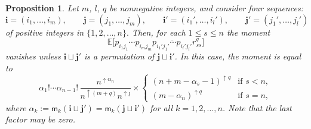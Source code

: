 \documentclass[pdftex]{sigma}
\numberwithin{equation}{section}
\newtheorem{Proposition}[Theorem]{Proposition}
\theoremstyle{definition}
\newcommand{\mult}{\mathsf{m}}
\begin{document}
\begin{Proposition}\label{prop:moment_R_ex1}
Let $m$, $l$, $q$ be nonnegative integers, and consider four sequences:
\[
\bm{i}=(i_1,\dots, i_m), \qquad \bm{j} =(j_1,\dots, j_m), \qquad
\bm{i}'=(i_1',\dots, i_l'), \qquad \bm{j}' =(j_1',\dots, j_l')
\]
 of positive integers in $\{1,2,\dots,n\}.$
Then, for each $1 \le s \le n$ the moment
\[
\mathbb{E} \bigl[p_{i_1 j_1} \cdots p_{i_m j_m} \overline{p_{i_1' j_1'} \cdots p_{i_l' j_l'}} r_{ss}^q\bigr]
\]
 vanishes unless $\bm{i} \sqcup \bm{j}'$ is a permutation of $\bm{j} \sqcup \bm{i}'$.
In this case, the moment is equal to
\[
\alpha_1 ! \cdots \alpha_{n-1}! \, \frac{n^{\uparrow \alpha_n}}{n^{\uparrow (m+q)} n^{\uparrow l}}
\times
\begin{cases}
(n+m-\alpha_s-1)^{\uparrow q} & \text{if $s<n$}, \\
(m-\alpha_n)^{\uparrow q} & \text{if $s=n$},
\end{cases}
\]
where $\alpha_k:=\mult_{k}(\bm{i}\sqcup \bm{j}') = \mult_{k}(\bm{j}\sqcup\bm{i}')$
for all $k=1,2,\dots, n$.
Note that the last factor may be zero.
\end{Proposition}
\end{document}
